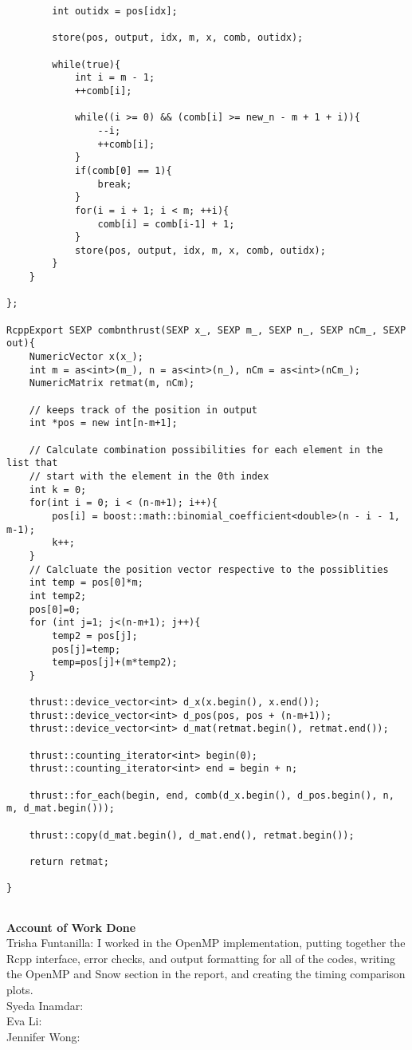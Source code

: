 {\begin{lstlisting}
        int outidx = pos[idx];
        
		store(pos, output, idx, m, x, comb, outidx);

		while(true){
			int i = m - 1;
			++comb[i];
	
			while((i >= 0) && (comb[i] >= new_n - m + 1 + i)){
				--i;
				++comb[i];
			}
			if(comb[0] == 1){
				break;
			}
			for(i = i + 1; i < m; ++i){
				comb[i] = comb[i-1] + 1;
			}
            store(pos, output, idx, m, x, comb, outidx);
		}
	}

};

RcppExport SEXP combnthrust(SEXP x_, SEXP m_, SEXP n_, SEXP nCm_, SEXP out){
	NumericVector x(x_);
	int m = as<int>(m_), n = as<int>(n_), nCm = as<int>(nCm_);
	NumericMatrix retmat(m, nCm);

    // keeps track of the position in output
    int *pos = new int[n-m+1];
    
    // Calculate combination possibilities for each element in the list that
    // start with the element in the 0th index
    int k = 0;
    for(int i = 0; i < (n-m+1); i++){
        pos[i] = boost::math::binomial_coefficient<double>(n - i - 1, m-1);
        k++;
    }
    // Calcluate the position vector respective to the possiblities
    int temp = pos[0]*m;
    int temp2;
    pos[0]=0;
    for (int j=1; j<(n-m+1); j++){
        temp2 = pos[j];
        pos[j]=temp;
        temp=pos[j]+(m*temp2);
    }
	
	thrust::device_vector<int> d_x(x.begin(), x.end());
    thrust::device_vector<int> d_pos(pos, pos + (n-m+1));
	thrust::device_vector<int> d_mat(retmat.begin(), retmat.end());
    
	thrust::counting_iterator<int> begin(0);
	thrust::counting_iterator<int> end = begin + n;

	thrust::for_each(begin, end, comb(d_x.begin(), d_pos.begin(), n, m, d_mat.begin()));

	thrust::copy(d_mat.begin(), d_mat.end(), retmat.begin());
	
	return retmat;
    
}


\end{lstlisting}
}

\newpage
\textbf{\Large{Account of Work Done}}\\
\null
Trisha Funtanilla: I worked in the OpenMP implementation, putting together the Rcpp interface, error checks, and output formatting for all of the codes, writing the OpenMP and Snow section in the report, and creating the timing comparison plots.
\\
\null
Syeda Inamdar:
\\
\null
Eva Li: 
\\
\null
Jennifer Wong:



